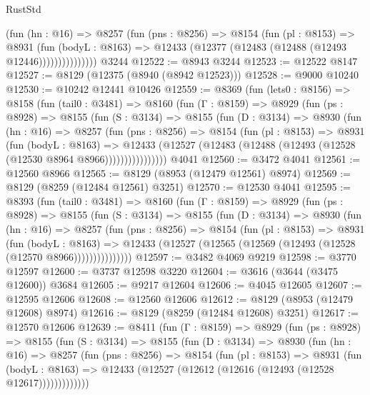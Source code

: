 \begin{lexlean}{RustStd}
\begin{coremodule}
                  (fun (hn : @16) =>
                  @8257
                    (fun (pns : @8256) =>
                    @8154
                      (fun (pl : @8153) =>
                      @8931
                        (fun (bodyL : @8163) =>
                        @12433 (@12377 (@12483 (@12488 (@12493 @12446)))))))))))))))
    @3244
@12522 := @8943 @3244
@12523 := @12522 @8147
@12527 := @8129 (@12375 (@8940 (@8942 @12523)))
@12528 := @9000 @10240
@12530 := @10242 @12441 @10426
@12559 := @8369
    (fun (lets0 : @8156) =>
    @8158
      (fun (tail0 : @3481) =>
      @8160
        (fun (Γ : @8159) =>
        @8929
          (fun (ps : @8928) =>
          @8155
            (fun (S : @3134) =>
            @8155
              (fun (D : @3134) =>
              @8930
                (fun (hn : @16) =>
                @8257
                  (fun (pns : @8256) =>
                  @8154
                    (fun (pl : @8153) =>
                    @8931
                      (fun (bodyL : @8163) =>
                      @12433
                        (@12527 (@12483 (@12488 (@12493 (@12528 (@12530 @8964 @8966))))))))))))))))
    @4041
@12560 := @3472 @4041
@12561 := @12560 @8966
@12565 := @8129 (@8953 (@12479 @12561) @8974)
@12569 := @8129 (@8259 (@12484 @12561) @3251)
@12570 := @12530 @4041
@12595 := @8393
    (fun (tail0 : @3481) =>
    @8160
      (fun (Γ : @8159) =>
      @8929
        (fun (ps : @8928) =>
        @8155
          (fun (S : @3134) =>
          @8155
            (fun (D : @3134) =>
            @8930
              (fun (hn : @16) =>
              @8257
                (fun (pns : @8256) =>
                @8154
                  (fun (pl : @8153) =>
                  @8931
                    (fun (bodyL : @8163) =>
                    @12433 (@12527 (@12565 (@12569 (@12493 (@12528 (@12570 @8966)))))))))))))))
@12597 := @3482 @4069 @9219
@12598 := @3770 @12597
@12600 := @3737 @12598 @3220
@12604 := @3616 (@3644 (@3475 @12600)) @3684
@12605 := @9217 @12604
@12606 := @4045 @12605
@12607 := @12595 @12606
@12608 := @12560 @12606
@12612 := @8129 (@8953 (@12479 @12608) @8974)
@12616 := @8129 (@8259 (@12484 @12608) @3251)
@12617 := @12570 @12606
@12639 := @8411
    (fun (Γ : @8159) =>
    @8929
      (fun (ps : @8928) =>
      @8155
        (fun (S : @3134) =>
        @8155
          (fun (D : @3134) =>
          @8930
            (fun (hn : @16) =>
            @8257
              (fun (pns : @8256) =>
              @8154
                (fun (pl : @8153) =>
                @8931
                  (fun (bodyL : @8163) =>
                  @12433 (@12527 (@12612 (@12616 (@12493 (@12528 @12617)))))))))))))

\end{coremodule}
\end{lexlean}
